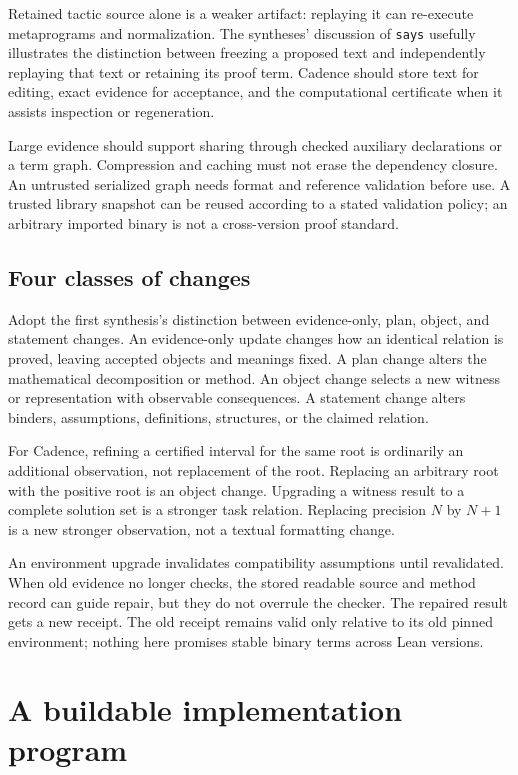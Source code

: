 \documentclass[11pt,letterpaper]{article}
\newcommand{\code}[1]{\nolinkurl{#1}}
\theoremstyle{definition}
\begin{document}
Retained tactic source alone is a weaker artifact: replaying it can re-execute
metaprograms and normalization. The syntheses' discussion of \code{says} usefully
illustrates the distinction between freezing a proposed text and independently
replaying that text or retaining its proof term\cite{synthesis,review}. Cadence
should store text for editing, exact evidence for acceptance, and the computational
certificate when it assists inspection or regeneration.

Large evidence should support sharing through checked auxiliary declarations or
a term graph. Compression and caching must not erase the dependency closure.
An untrusted serialized graph needs format and reference validation before use.
A trusted library snapshot can be reused according to a stated validation policy;
an arbitrary imported binary is not a cross-version proof standard.

\subsection{Four classes of changes}
Adopt the first synthesis's distinction between evidence-only, plan, object, and
statement changes\cite{synthesis}. An evidence-only update changes how an identical
relation is proved, leaving accepted objects and meanings fixed. A plan change
alters the mathematical decomposition or method. An object change selects a
new witness or representation with observable consequences. A statement change
alters binders, assumptions, definitions, structures, or the claimed relation.

For Cadence, refining a certified interval for the same root is ordinarily an
additional observation, not replacement of the root. Replacing an arbitrary root
with the positive root is an object change. Upgrading a witness result to a
complete solution set is a stronger task relation. Replacing precision \(N\) by
\(N+1\) is a new stronger observation, not a textual formatting change.

An environment upgrade invalidates compatibility assumptions until revalidated.
When old evidence no longer checks, the stored readable source and method record
can guide repair, but they do not overrule the checker. The repaired result gets a
new receipt. The old receipt remains valid only relative to its old pinned
environment; nothing here promises stable binary terms across Lean versions.

\section{A buildable implementation program}\label{sec:implementation}
\end{document}
